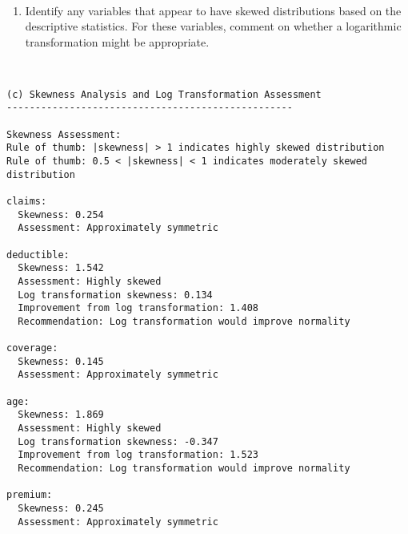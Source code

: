 \documentclass[8pt, twocolumn]{extarticle}
\providecommand{\tightlist}{%
      \setlength{\itemsep}{0pt}\setlength{\parskip}{0pt}}
\begin{document}
    \begin{center}
    \end{center}
    { \hspace*{\fill} \\}
    
    \begin{enumerate}
\def\labelenumi{(\alph{enumi})}
\setcounter{enumi}{2}
\tightlist
\item
  Identify any variables that appear to have skewed distributions based
  on the descriptive statistics. For these variables, comment on whether
  a logarithmic transformation might be appropriate.
\end{enumerate}

    \begin{Verbatim}[commandchars=\\\{\}]


(c) Skewness Analysis and Log Transformation Assessment
--------------------------------------------------

Skewness Assessment:
Rule of thumb: |skewness| > 1 indicates highly skewed distribution
Rule of thumb: 0.5 < |skewness| < 1 indicates moderately skewed distribution

claims:
  Skewness: 0.254
  Assessment: Approximately symmetric

deductible:
  Skewness: 1.542
  Assessment: Highly skewed
  Log transformation skewness: 0.134
  Improvement from log transformation: 1.408
  Recommendation: Log transformation would improve normality

coverage:
  Skewness: 0.145
  Assessment: Approximately symmetric

age:
  Skewness: 1.869
  Assessment: Highly skewed
  Log transformation skewness: -0.347
  Improvement from log transformation: 1.523
  Recommendation: Log transformation would improve normality

premium:
  Skewness: 0.245
  Assessment: Approximately symmetric

    \end{Verbatim}

    \begin{center}
    \end{center}
    { \hspace*{\fill} \\}
    
\end{document}

